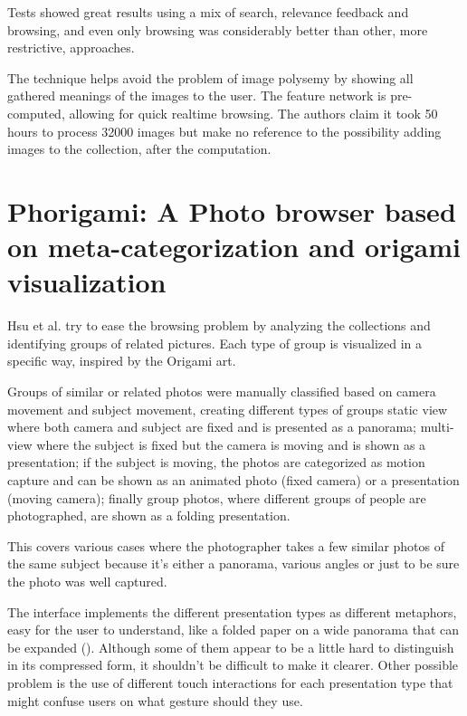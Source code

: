 Tests showed great results using a mix of search, relevance feedback and browsing, and even only browsing was considerably better than other, more restrictive, approaches.

The technique helps avoid the problem of image polysemy by showing all gathered meanings of the images to the user.
The feature network is pre-computed, allowing for quick realtime browsing. The authors claim it took 50 hours to process 32000 images but make no reference to the possibility adding images to the collection, after the computation.


\section{Phorigami: A Photo browser based on meta-categorization and origami visualization} %
\label{sub:Hsu}

Hsu et al. \cite{Hsu:2009p2696} try to ease the browsing problem by analyzing the collections and identifying groups of related pictures. Each type of group is visualized in a specific way, inspired by the Origami art.

Groups of similar or related photos were manually classified based on camera movement and subject movement, creating different types of groups static view where both camera and subject are fixed and is presented as a panorama; multi-view where the subject is fixed but the camera is moving and is shown as a presentation; if the subject is moving, the photos are categorized as motion capture and can be shown as an animated photo (fixed camera) or a presentation (moving camera); finally group photos, where different groups of people are photographed, are shown as a folding presentation.

This covers various cases where the photographer takes a few similar photos of the same subject because it's either a panorama, various angles or just to be sure the photo was well captured. 

The interface implements the different presentation types as different metaphors, easy for the user to understand, like a folded paper on a wide panorama that can be expanded (). Although some of them appear to be a little hard to distinguish in its compressed form, it shouldn't be difficult to make it clearer. Other possible problem is the use of different touch interactions for each presentation type that might confuse users on what gesture should they use.

